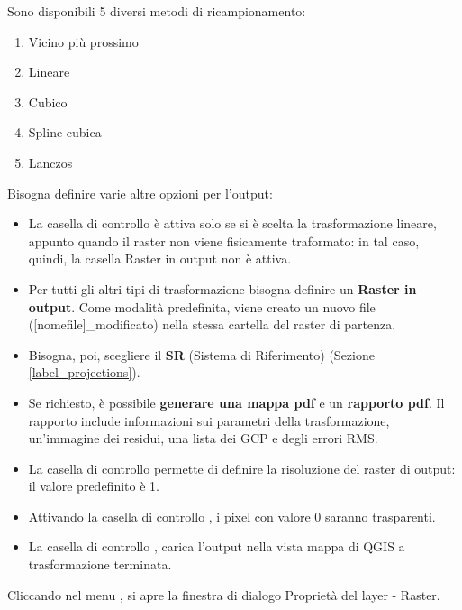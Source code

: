 Sono disponibili 5 diversi metodi di ricampionamento:

\begin{enumerate}
\item Vicino più prossimo
\item Lineare
\item Cubico
\item Spline cubica
\item Lanczos
\end{enumerate}


Bisogna definire varie altre opzioni per l'output:

\begin{itemize}[label=--]
\item La casella di controllo  è attiva solo
se si è scelta la trasformazione lineare, appunto quando il raster non viene fisicamente 
traformato: in tal caso, quindi, la casella Raster in output non è attiva.
\item Per tutti gli altri tipi di trasformazione bisogna definire un \textbf{Raster in output}. 
Come modalità predefinita, viene creato un nuovo file ([nomefile]\_modificato) nella 
stessa cartella del raster di partenza.
\item Bisogna, poi, scegliere il \textbf{SR} (Sistema di Riferimento) (Sezione \ref{label_projections}). 
\item Se richiesto, è possibile \textbf{generare una mappa pdf} e un \textbf{rapporto pdf}. 
Il rapporto include informazioni sui parametri della trasformazione, un'immagine dei residui, una 
lista dei GCP e degli errori RMS.
\item La casella di controllo  permette di definire la 
risoluzione del raster di output: il valore predefinito è 1.
\item Attivando la casella di controllo , 
i pixel con valore 0 saranno trasparenti.
\item La casella di controllo , carica l'output nella vista 
mappa di QGIS a trasformazione terminata. 
\end{itemize}


Cliccando  nel menu , si apre la finestra 
di dialogo Proprietà del layer - Raster.

